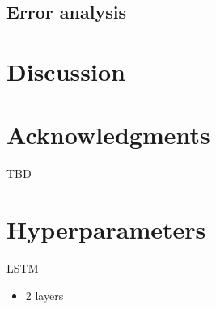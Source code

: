 \documentclass[11pt,a4paper]{article}
\begin{document}
\subsection{Error analysis}
\paragraph{}

\section{Discussion}


\section*{Acknowledgments}
TBD




\appendix

\section{Hyperparameters}
\label{sec:hyperparams}
LSTM
\begin{itemize}
\item 2 layers
\end{itemize}
\end{document}
